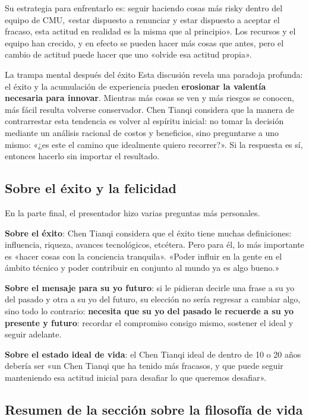 \documentclass[a4paper]{article}
\begin{document}
Su estrategia para enfrentarlo es: seguir haciendo cosas más risky dentro del equipo de CMU, «estar dispuesto a renunciar y estar dispuesto a aceptar el fracaso, esta actitud en realidad es la misma que al principio». Los recursos y el equipo han crecido, y en efecto se pueden hacer más cosas que antes, pero el cambio de actitud puede hacer que uno «olvide esa actitud propia».

\begin{warningbox}{La trampa mental después del éxito}
Esta discusión revela una paradoja profunda: el éxito y la acumulación de experiencia pueden \textbf{erosionar la valentía necesaria para innovar}. Mientras más cosas se ven y más riesgos se conocen, más fácil resulta volverse conservador. Chen Tianqi considera que la manera de contrarrestar esta tendencia es volver al espíritu inicial: no tomar la decisión mediante un análisis racional de costos y beneficios, sino preguntarse a uno mismo: «¿es este el camino que idealmente quiero recorrer?». Si la respuesta es sí, entonces hacerlo sin importar el resultado.
\end{warningbox}

\subsection{Sobre el éxito y la felicidad}

En la parte final, el presentador hizo varias preguntas más personales.

\textbf{Sobre el éxito}: Chen Tianqi considera que el éxito tiene muchas definiciones: influencia, riqueza, avances tecnológicos, etcétera. Pero para él, lo más importante es «hacer cosas con la conciencia tranquila». «Poder influir en la gente en el ámbito técnico y poder contribuir en conjunto al mundo ya es algo bueno.»

\textbf{Sobre el mensaje para su yo futuro}: si le pidieran decirle una frase a su yo del pasado y otra a su yo del futuro, su elección no sería regresar a cambiar algo, sino todo lo contrario: \textbf{necesita que su yo del pasado le recuerde a su yo presente y futuro}: recordar el compromiso consigo mismo, sostener el ideal y seguir adelante.

\textbf{Sobre el estado ideal de vida}: el Chen Tianqi ideal de dentro de 10 o 20 años debería ser «un Chen Tianqi que ha tenido más fracasos, y que puede seguir manteniendo esa actitud inicial para desafiar lo que queremos desafiar».

\subsection{Resumen de la sección sobre la filosofía de vida}
\end{document}
